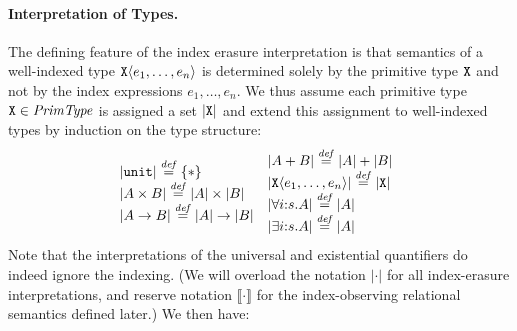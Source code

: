 
\paragraph{Interpretation of Types.}

The defining feature of the index erasure interpretation is that 
semantics of a well-indexed type $\textup{\texttt{X}}\langle e_1,\ldots,e_n \rangle$ is
determined solely by the primitive type $\textup{\texttt{X}}$ and not by the
index expressions $e_1,\ldots,e_n$. %
We thus assume each
primitive type $\textup{\texttt{X}} \in \mathit{PrimType}$ is assigned a set
$\left| \textup{\texttt{X}}\right|$ and %
extend this assignment to %
well-indexed types by induction on the type structure:
\begin{displaymath}
  \begin{array}{@{}c@{\hspace{0em}}c@{}}
    \begin{array}{@{}l}
      \tySem{\tyUnit} \isDefinedAs \{*\} \\
      \tySem{A \tyProduct B} \isDefinedAs \tySem{A} \times \tySem{B} \\
      \tySem{A \tyArr B} \isDefinedAs \tySem{A} \to \tySem{B} \\
    \end{array}
    &
    \begin{array}{l}
      \tySem{A + B} \isDefinedAs \tySem{A} + \tySem{B} \\
      \tySem{\tyPrim{X}{e_1,\ldots,e_n}} \isDefinedAs \tyPrimSem{\tyPrimNm{X}} \\
      \tySem{\forall i\mathord:s. A} \isDefinedAs \tySem{A} \\
      \tySem{\exists i\mathord:s. A} \isDefinedAs \tySem{A}
    \end{array}
  \end{array}
\end{displaymath}
Note that the interpretations of the universal and existential
quantifiers do indeed ignore the indexing. (We will overload the
notation $\left|\cdot\right|$ for all index-erasure interpretations, 
and reserve notation $\llbracket\cdot\rrbracket$ for the
index-observing relational semantics defined later.)
We then have:


